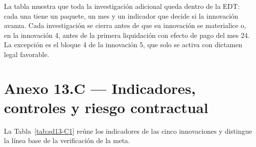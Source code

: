 La tabla muestra que toda la investigación adicional queda dentro de la EDT: cada una tiene un paquete, un mes y un indicador que decide si la innovación avanza. Cada investigación se cierra antes de que su innovación se materialice o, en la innovación 4, antes de la primera liquidación con efecto de pago del mes 24. La excepción es el bloque 4 de la innovación 5, que solo se activa con dictamen legal favorable.

\section*{Anexo 13.C — Indicadores, controles y riesgo contractual}
\setcounter{table}{0}

La Tabla~\ref{tab:sd13-C1} reúne los indicadores de las cinco innovaciones y distingue la línea base de la verificación de la meta.

